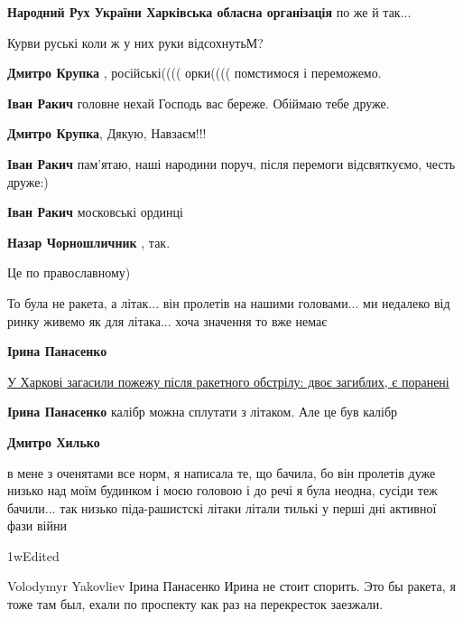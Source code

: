 \begin{itemize}
\begin{itemize}
\textbf{Народний Рух України Харківська обласна організація} по же й так...
\end{itemize} %

Курви руські коли ж у них руки відсохнутьМ?

\begin{itemize} %
\textbf{Дмитро Крупка} , російські(((( орки(((( помстимося і переможемо.

\textbf{Іван Ракич} головне нехай Господь вас береже. Обіймаю тебе друже.

\textbf{Дмитро Крупка}, Дякую, Навзаєм!!!

\textbf{Іван Ракич} пам'ятаю, наші народини поруч, після перемоги відсвяткуємо, честь друже:)

\textbf{Іван Ракич} московські ординці

\textbf{Назар Чорношличник} , так.
\end{itemize} %

Це по православному)


То була не ракета, а літак... він пролетів на нашими головами... ми недалеко від
ринку живемо як для літака... хоча значення то вже немає

\begin{itemize} %
\textbf{Ірина Панасенко} 

\href{https://www.youtube.com/watch?v=x6Rps9dSdQk}{%
У Харкові загасили пожежу після ракетного обстрілу: двоє загиблих, є поранені
}

\textbf{Ірина Панасенко} калібр можна сплутати з літаком. Але це був калібр

\textbf{Дмитро Хилько} 

в мене з оченятами все норм, я написала те, що бачила, бо він пролетів дуже
низько над моїм будинком і моєю головою і до речі я була неодна, сусіди теж
бачили... так низько піда-рашистскі літаки літали тилькі у перші дні активної
фази війни

    1wEdited

Volodymyr Yakovliev
Ірина Панасенко Ирина не стоит спорить. Это бы ракета, я тоже там был, ехали по проспекту как раз на перекресток заезжали.
\end{itemize} %

\end{itemize} %
